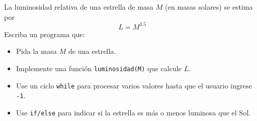 \documentclass[10pt]{article}
\begin{document}

\begin{tcolorbox}[title={Pregunta 3 – Clasificación de estrellas por luminosidad}]
La luminosidad relativa de una estrella de masa $M$ (en masas solares) se estima por
\[
  L = M^{3.5}
\]
Escriba un programa que:
\begin{itemize}
  \item Pida la masa $M$ de una estrella.
  \item Implemente una función \texttt{luminosidad(M)} que calcule $L$.
  \item Use un ciclo \texttt{while} para procesar varios valores hasta que el usuario ingrese \texttt{-1}.
  \item Use \texttt{if/else} para indicar si la estrella es más o menos luminosa que el Sol. 
  
\end{itemize}
\end{tcolorbox}
\end{document}
